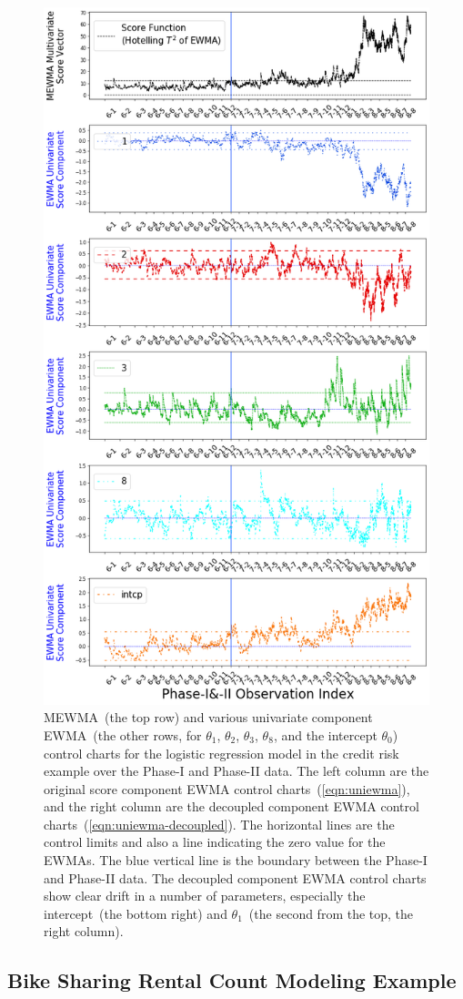 \documentclass[twoside,11pt]{article}
\begin{document}
\begin{figure}[H]
\includegraphics[width = 0.48\linewidth]{../figures/v14/credit_default/logi_scal_PI_train_sample_weights/pos_single_credit_fisher_mlines_with_regu_1e-08_0_0001_0_001_99_0.png}
\caption{
MEWMA~(the top row) and various univariate component EWMA~(the other rows, for $\theta_1$, $\theta_2$, $\theta_3$, $\theta_8$, and the intercept $\theta_0$) control charts for the logistic regression model in the credit risk example over the Phase-I and Phase-II data. The left column are the original score component EWMA control charts~(\ref{eqn:uniewma}), and the right column are the decoupled component EWMA control charts~(\ref{eqn:uniewma-decoupled}). The horizontal lines are the control limits and also a line indicating the zero value for the EWMAs. The blue vertical line is the boundary between the Phase-I and Phase-II data. The decoupled component EWMA control charts show clear drift in a number of parameters, especially the intercept~(the bottom right) and $\theta_1$~(the second from the top, the right column).
}
\label{fig:credit_default_diag}
\end{figure}

\subsection{Bike Sharing Rental Count Modeling Example}
\label{ss:bs_ds}
\end{document}
